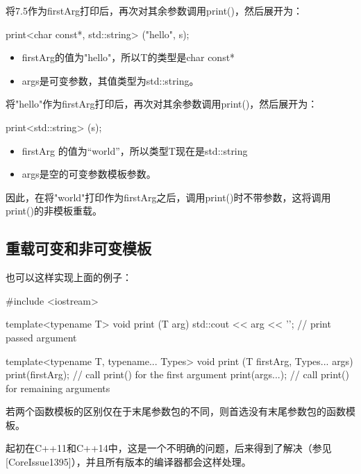 将7.5作为firstArg打印后，再次对其余参数调用print()，然后展开为：

\begin{cpp}
print<char const*, std::string> ("hello", s);
\end{cpp}

\begin{itemize}
\item 
firstArg的值为"hello"，所以T的类型是char const*

\item 
args是可变参数，其值类型为std::string。
\end{itemize}

将"hello"作为firstArg打印后，再次对其余参数调用print()，然后展开为：

\begin{cpp}
print<std::string> (s);
\end{cpp}

\begin{itemize}
\item 
firstArg 的值为“world”，所以类型T现在是std::string

\item 
args是空的可变参数模板参数。
\end{itemize}

因此，在将"world"打印作为firstArg之后，调用print()时不带参数，这将调用print()的非模板重载。

\subsection{重载可变和非可变模板}

也可以这样实现上面的例子：

\begin{cpp}
#include <iostream>

template<typename T>
void print (T arg) {
	std::cout << arg << '\n'; // print passed argument
}

template<typename T, typename... Types>
void print (T firstArg, Types... args) {
	print(firstArg); // call print() for the first argument
	print(args...); // call print() for remaining arguments
}
\end{cpp}

若两个函数模板的区别仅在于末尾参数包的不同，则首选没有末尾参数包的函数模板。

\begin{notice}
起初在C++11和C++14中，这是一个不明确的问题，后来得到了解决（参见[CoreIssue1395]），并且所有版本的编译器都会这样处理。
\end{notice}

